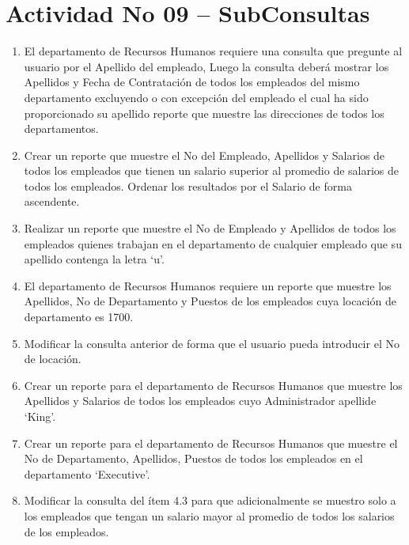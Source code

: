 \section{Actividad No 09 – SubConsultas} 
		
\begin{enumerate}[1.]
	\item El departamento de Recursos Humanos requiere una consulta que pregunte al usuario por el Apellido del empleado, Luego la consulta deber\'a mostrar los Apellidos y Fecha de Contrataci\'on de todos los empleados del mismo departamento excluyendo o con excepción del empleado el cual ha sido proporcionado su apellido reporte que muestre las direcciones de todos los departamentos.
	\\


	\item Crear un reporte que muestre el No del Empleado, Apellidos y Salarios de todos los empleados que tienen un salario superior al promedio de salarios de todos los empleados. Ordenar los resultados por el Salario de forma ascendente.
	\\


	\item Realizar un reporte que muestre el No de Empleado y Apellidos de todos los empleados quienes trabajan en el departamento de cualquier empleado que su apellido contenga la letra ‘u’.
	\\

	\item El departamento de Recursos Humanos requiere un reporte que muestre los Apellidos, No de Departamento y Puestos de los empleados cuya locación de departamento es 1700.
	\\

	\item Modificar la consulta anterior de forma que el usuario pueda introducir el No de locaci\'on.
	\\


	\item Crear un reporte para el departamento de Recursos Humanos que muestre los Apellidos y Salarios de todos los empleados cuyo Administrador apellide ‘King’.
	\\


	\item Crear un reporte para el departamento de Recursos Humanos que muestre el No de Departamento, Apellidos, Puestos de todos los empleados en el departamento ‘Executive’.
	\\


	\item Modificar la consulta del ítem 4.3 para que adicionalmente se muestro solo a los empleados que tengan un salario mayor al promedio de todos los salarios de los empleados.



\end{enumerate}
